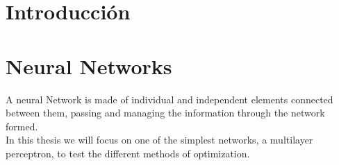 \documentclass[a4paper, 11pt]{article}
\begin{document}
\section*{Introducción}
\newpage

\newpage
\section{Neural Networks} 
A neural Network is made of individual and independent elements connected between them, passing and managing the information through the network formed.\\
In this thesis we will focus on one of the simplest networks, a multilayer perceptron, to test the different methods of optimization.





\end{document}
